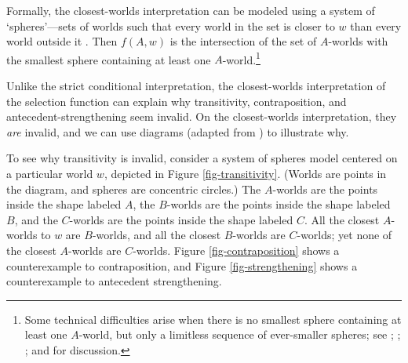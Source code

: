 Formally, the closest-worlds interpretation can be modeled using a system of `spheres'---sets of worlds such that every world in the set is closer to $w$ than every world outside it \citep{lewis-counterfactuals}. Then $f(A, w)$ is the intersection of the set of $A$-worlds with the smallest sphere containing at least one $A$-world.\footnote{Some technical difficulties arise when there is no smallest sphere containing at least one $A$-world, but only a limitless sequence of ever-smaller spheres; see \citet[424--425]{Lewis1973-LEWCAC}; \citet[96--99]{Stalnaker1981-STAADO-4}; \citet{Warmbrod1982-WARADO}; and \citet{Diez2015-DEZCTD} for discussion.}

Unlike the strict conditional interpretation, the closest-worlds interpretation of the selection function can explain why transitivity, contraposition, and antecedent-strengthening seem invalid.  On the closest-worlds interpretation, they \emph{are} invalid, and we can use diagrams (adapted from \citealp{lewis-counterfactuals}) to illustrate why.

To see why transitivity is invalid, consider a system of spheres model centered on a particular world $w$, depicted in Figure \ref{fig-transitivity}.  (Worlds are points in the diagram, and spheres are concentric circles.)  The $A$-worlds are the points inside the shape labeled $A$, the $B$-worlds are the points inside the shape labeled $B$, and the $C$-worlds are the points inside the shape labeled $C$.  All the closest $A$-worlds to $w$ are $B$-worlds, and all the closest $B$-worlds are $C$-worlds; yet none of the closest $A$-worlds are $C$-worlds.  Figure \ref{fig-contraposition} shows a counterexample to contraposition, and Figure \ref{fig-strengthening} shows a counterexample to antecedent strengthening.

